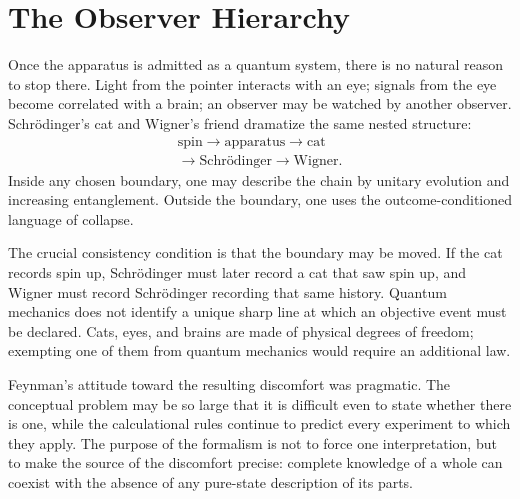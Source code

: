 \section{The Observer Hierarchy}

Once the apparatus is admitted as a quantum system, there is no natural reason to stop there. Light from the pointer interacts with an eye; signals from the eye become correlated with a brain; an observer may be watched by another observer. Schr\"odinger's cat and Wigner's friend dramatize the same nested structure:
\begin{equation}
\begin{gathered}
\text{spin}
\longrightarrow
\text{apparatus}
\longrightarrow
\text{cat}\\
\longrightarrow
\text{Schr\"odinger}
\longrightarrow
\text{Wigner}.
\end{gathered}
\label{eq:l7-observer-chain}
\end{equation}
Inside any chosen boundary, one may describe the chain by unitary evolution and increasing entanglement. Outside the boundary, one uses the outcome-conditioned language of collapse.

The crucial consistency condition is that the boundary may be moved. If the cat records spin up, Schr\"odinger must later record a cat that saw spin up, and Wigner must record Schr\"odinger recording that same history. Quantum mechanics does not identify a unique sharp line at which an objective event must be declared. Cats, eyes, and brains are made of physical degrees of freedom; exempting one of them from quantum mechanics would require an additional law.

Feynman's attitude toward the resulting discomfort was pragmatic. The conceptual problem may be so large that it is difficult even to state whether there is one, while the calculational rules continue to predict every experiment to which they apply. The purpose of the formalism is not to force one interpretation, but to make the source of the discomfort precise: complete knowledge of a whole can coexist with the absence of any pure-state description of its parts.

\begin{classroomqa}
\end{classroomqa}

